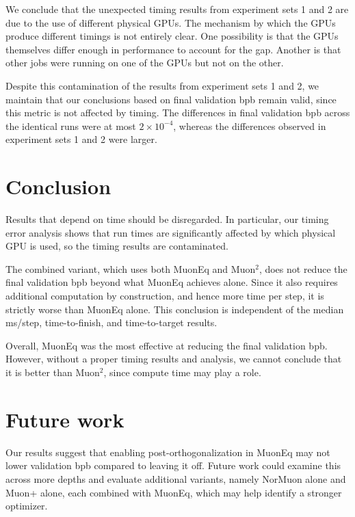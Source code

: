\documentclass[11pt]{article}
\begin{document}
We conclude that the unexpected timing results from experiment sets 1 and 2 are due to the use of different physical GPUs. The mechanism by which the GPUs produce different timings is not entirely clear. One possibility is that the GPUs themselves differ enough in performance to account for the gap. Another is that other jobs were running on one of the GPUs but not on the other.

Despite this contamination of the results from experiment sets 1 and 2, we maintain that our conclusions based on final validation bpb remain valid, since this metric is not affected by timing. The differences in final validation bpb across the identical runs were at most $2\times10^{-4}$, whereas the differences observed in experiment sets 1 and 2 were larger.



\section{Conclusion}
\label{Conclusion}

Results that depend on time should be disregarded. In particular, our timing error analysis shows that run times are significantly affected by which physical GPU is used, so the timing results are contaminated. 

The combined variant, which uses both MuonEq and Muon$^2$, does not reduce the final validation bpb beyond what MuonEq achieves alone. Since it also requires additional computation by construction, and hence more time per step, it is strictly worse than MuonEq alone. This conclusion is independent of the median ms/step, time-to-finish, and time-to-target results.

Overall, MuonEq was the most effective at reducing the final validation bpb. However, without a proper timing results and analysis, we cannot conclude that it is better than Muon$^2$, since compute time may play a role.



\section{Future work}
\label{sec:future-work}

Our results suggest that enabling post-orthogonalization in MuonEq may not lower validation bpb compared to leaving it off. Future work could examine this across more depths and evaluate additional variants, namely NorMuon alone and Muon+ alone, each combined with MuonEq, which may help identify a stronger optimizer. 
\end{document}
